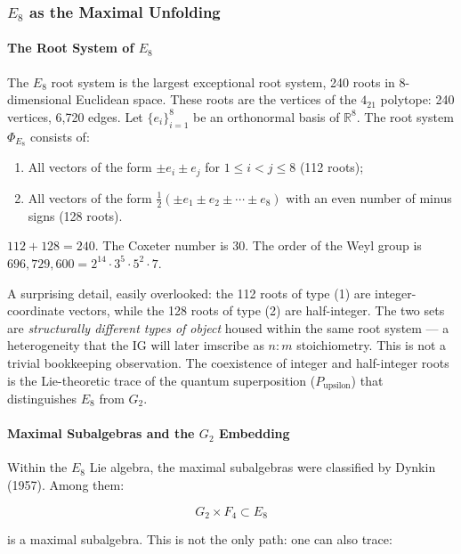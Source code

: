 \documentclass[12pt,a4paper]{article}
\begin{document}
\subsubsection{$E_8$ as the Maximal Unfolding}

\paragraph{The Root System of $E_8$}

The $E_8$ root system is the largest exceptional root system, 240 roots in 8-dimensional Euclidean space. These roots are the vertices of the $4_{21}$ polytope: 240 vertices, 6,720 edges. Let $\{e_i\}_{i=1}^8$ be an orthonormal basis of $\mathbb{R}^8$. The root system $\Phi_{E_8}$ consists of:

\begin{enumerate}
    \item All vectors of the form $\pm e_i \pm e_j$ for $1 \leq i < j \leq 8$ (112 roots);
    \item All vectors of the form $\frac{1}{2}(\pm e_1 \pm e_2 \pm \cdots \pm e_8)$ with an even number of minus signs (128 roots).
\end{enumerate}

$112 + 128 = 240$. The Coxeter number is 30. The order of the Weyl group is $696{,}729{,}600 = 2^{14} \cdot 3^5 \cdot 5^2 \cdot 7$.

A surprising detail, easily overlooked: the 112 roots of type (1) are integer-coordinate vectors, while the 128 roots of type (2) are half-integer. The two sets are \emph{structurally different types of object} housed within the same root system --- a heterogeneity that the IG will later imscribe as $n{:}m$ stoichiometry. This is not a trivial bookkeeping observation. The coexistence of integer and half-integer roots is the Lie-theoretic trace of the quantum superposition ($P_{\text{upsilon}}$) that distinguishes $E_8$ from $G_2$.

\paragraph{Maximal Subalgebras and the $G_2$ Embedding}

Within the $E_8$ Lie algebra, the maximal subalgebras were classified by Dynkin (1957). Among them:

\[G_2 \times F_4 \subset E_8\]

is a maximal subalgebra. This is not the only path: one can also trace:
\end{document}
